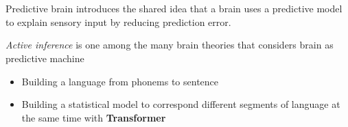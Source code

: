 \section{}
    
    \begin{frame}{Predictive brain}
        \cite{spratling-2017-a-review-of-predictive-coding-algorithms} introduces the shared idea that a brain uses a predictive model to explain sensory input by reducing prediction error.
        
        \textit{Active inference} \cite{friston-2005-a-predictive-brain-how-perception-and-action-are-coupled-in-neural-networks} is one among the many brain theories that considers brain as predictive machine
        
        \begin{itemize}
            \item Building a language from phonems to sentence
            \item Building a statistical model to correspond different segments of language at the same time with \textbf{Transformer}
        \end{itemize}
    
    
    \end{frame}
    
    \subsection{}
        
        
    
